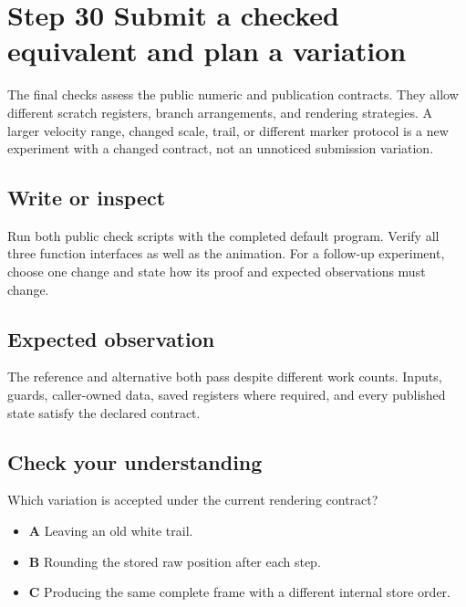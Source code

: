 \section{Step 30 Submit a checked equivalent and plan a variation}\label{ball-s30}

The final checks assess the public numeric and publication contracts. They allow different scratch registers, branch arrangements, and rendering strategies. A larger velocity range, changed scale, trail, or different marker protocol is a new experiment with a changed contract, not an unnoticed submission variation.

\subsection{Write or inspect}
Run both public check scripts with the completed default program. Verify all three function interfaces as well as the animation. For a follow-up experiment, choose one change and state how its proof and expected observations must change.

\subsection{Expected observation}
The reference and alternative both pass despite different work counts. Inputs, guards, caller-owned data, saved registers where required, and every published state satisfy the declared contract.

\subsection{Check your understanding}
Which variation is accepted under the current rendering contract?

\begin{itemize}
  \item \textbf{A} Leaving an old white trail.
  \item \textbf{B} Rounding the stored raw position after each step.
  \item \textbf{C} Producing the same complete frame with a different internal store order.
\end{itemize}
